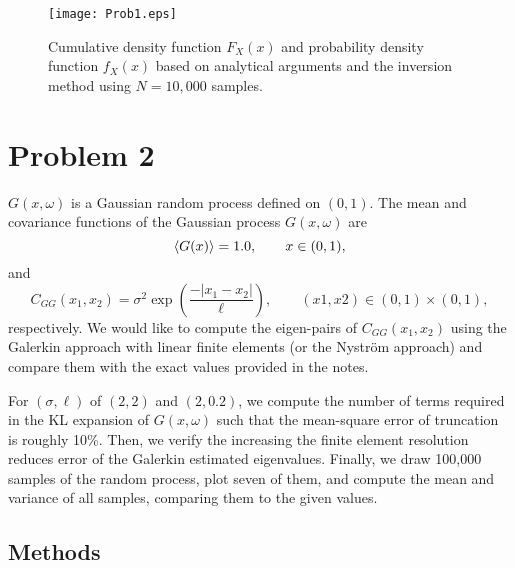 \documentclass[11pt]{article}
\begin{document}
\begin{figure}[b]
\centering
\texttt{[image: Prob1.eps]}
\caption{Cumulative density function $F_X(x)$ and probability density function $f_X(x)$ based on analytical arguments and the inversion method using $N=10,\!000$ samples.}
\label{fig:prob1}
\end{figure}

\section*{Problem 2} %

$G(x, \omega)$ is a Gaussian random process defined on $(0, 1)$. The mean and covariance functions of the Gaussian process $G(x, \omega)$ are
\begin{equation}
\left\langle G(x) \right\rangle = 1.0, \qquad x \in (0,1),
\end{equation}
and
\begin{equation}
C_{GG}(x_1,x_2) = \sigma^2 \exp \left( \frac{- | x_1-x_2 | }{\ell} \right), \qquad (x1,x2) \in (0,1) \times (0,1),
\end{equation}
respectively. We would like to compute the eigen-pairs of $C_{GG}(x_1,x_2)$ using the Galerkin approach with linear finite elements (or the Nystr\"om approach) and compare them with the exact values provided in the notes.

For $(\sigma, \ell)$ of $(2,2)$ and $(2,0.2)$, we compute the number of terms required in the KL expansion of $G(x,\omega)$ such that the mean-square error of truncation is roughly 10\%. Then, we verify the increasing the finite element resolution reduces error of the Galerkin estimated eigenvalues. Finally, we draw 100,000 samples of the random process, plot seven of them, and compute the mean and variance of all samples, comparing them to the given values.

\subsection*{Methods}
\end{document}
